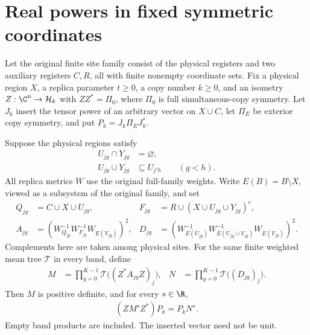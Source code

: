 \section{Real powers in fixed symmetric coordinates}

\begin{theorem}
    \label{thm:bell_compressed_band_product_powers}
    \leanok
    Let the original finite site family consist of the physical registers
    and two auxiliary registers $C,R$, all with finite nonempty coordinate
    sets. Fix a physical region $X$, a replica parameter $t\ge0$, a copy
    number $k\ge0$, and an isometry $Z:\C^n\to\mathcal H_k$ with
    $ZZ^*=\Pi_0$, where $\Pi_0$ is full simultaneous-copy symmetry.
    Let $J_k$ insert the tensor power of an arbitrary vector on $X\cup C$,
    let $\Pi_E$ be exterior copy symmetry, and put $P_k=J_k\Pi_EJ_k^*$.

    Suppose the physical regions satisfy
    \begin{align*}
        U_{jg}\cap Y_{jg}&=\varnothing,\\
        U_{jg}\cup Y_{jg}&\subseteq U_{j'h}\qquad(g<h).
    \end{align*}
    All replica metrics $W$ use the original full-family weights. Write
    $E(B)=B\setminus X$, viewed as a subsystem of the original family, and set
    \begin{align*}
        Q_{jg}&=C\cup X\cup U_{jg},&
        F_{jg}&=R\cup(X\cup U_{jg}\cup Y_{jg})^c,\\
        A_{jg}&=(W_{Q_{jg}}^{-1}W_{F_{jg}}^{-1}W_{E(Y_{jg})})^2,&
        D_{jg}&=(W_{E(U_{jg})}^{-1}W_{E(U_{jg}\cup Y_{jg})}^{-1}
                    W_{E(Y_{jg})})^2.
    \end{align*}
    Complements here are taken among physical sites. For the same finite
    weighted mean tree $\mathcal T$ in every band, define
    \begin{align*}
        M&=\prod_{g=0}^{K-1}\mathcal T\bigl((Z^*A_{jg}Z)_j\bigr),&
        N&=\prod_{g=0}^{K-1}\mathcal T\bigl((D_{jg})_j\bigr).
    \end{align*}
    Then $M$ is positive definite, and for every $s\in\R$,
    \begin{align*}
        (ZM^sZ^*)P_k=P_kN^s.
    \end{align*}
    Empty band products are included. The inserted vector need not be unit.
\end{theorem}
